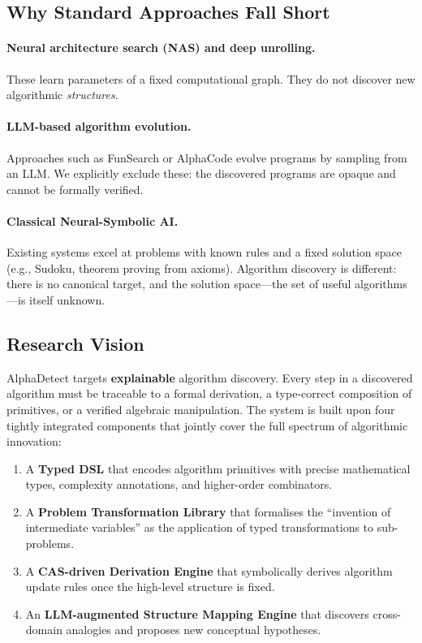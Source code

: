 \documentclass[12pt,a4paper]{article}
\begin{document}
\subsection{Why Standard Approaches Fall Short}

\paragraph{Neural architecture search (NAS) and deep unrolling.}
These learn parameters of a fixed computational graph.  They do not discover
new algorithmic \emph{structures}.

\paragraph{LLM-based algorithm evolution.}
Approaches such as FunSearch or AlphaCode evolve programs by sampling from an
LLM.  We explicitly exclude these: the discovered programs are opaque and
cannot be formally verified.

\paragraph{Classical Neural-Symbolic AI.}
Existing systems excel at problems with known rules and a fixed solution space
(e.g., Sudoku, theorem proving from axioms).  Algorithm discovery is different:
there is no canonical target, and the solution space---the set of useful
algorithms---is itself unknown.

\subsection{Research Vision}

AlphaDetect targets \textbf{explainable} algorithm discovery.  Every step in a
discovered algorithm must be traceable to a formal derivation, a type-correct
composition of primitives, or a verified algebraic manipulation.  The system is
built upon four tightly integrated components that jointly cover the full
spectrum of algorithmic innovation:
\begin{enumerate}[leftmargin=2em, itemsep=0pt]
  \item A \textbf{Typed DSL} that encodes algorithm primitives with precise
        mathematical types, complexity annotations, and higher-order
        combinators.
  \item A \textbf{Problem Transformation Library} that formalises the
        ``invention of intermediate variables'' as the application of typed
        transformations to sub-problems.
  \item A \textbf{CAS-driven Derivation Engine} that symbolically derives
        algorithm update rules once the high-level structure is fixed.
  \item An \textbf{LLM-augmented Structure Mapping Engine} that discovers
        cross-domain analogies and proposes new conceptual hypotheses.
\end{enumerate}
\end{document}
